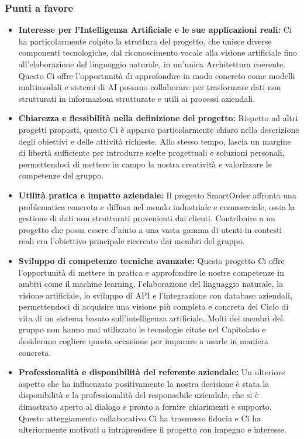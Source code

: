 \documentclass[a4paper,12pt]{article}
\begin{document}
\subsubsection{Punti a favore}

\begin{itemize}
    \item \textbf{Interesse per l’Intelligenza Artificiale e le sue applicazioni reali:} Ci ha particolarmente colpito la struttura del progetto, che unisce diverse componenti tecnologiche, dal riconoscimento vocale alla visione artificiale fino all’elaborazione del linguaggio naturale, in un’unica Architettura coerente. Questo Ci offre l’opportunità di approfondire in modo concreto come modelli multimodali e sistemi di AI possano collaborare per trasformare dati non strutturati in informazioni strutturate e utili ai processi aziendali.
    \item \textbf{Chiarezza e flessibilità nella definizione del progetto:} Rispetto ad altri progetti proposti, questo Ci è apparso particolarmente chiaro nella descrizione degli obiettivi e delle attività richieste. Allo stesso tempo, lascia un margine di libertà sufficiente per introdurre scelte progettuali e soluzioni personali, permettendoci di mettere in campo la nostra creatività e valorizzare le competenze del gruppo.
    \item \textbf{Utilità pratica e impatto aziendale:} Il progetto SmartOrder affronta una problematica concreta e diffusa nel mondo industriale e commerciale, ossia la gestione di dati non strutturati provenienti dai clienti. Contribuire a un progetto che possa essere d’aiuto a una vasta gamma di utenti in contesti reali era l’obiettivo principale ricercato dai membri del gruppo.
    \item \textbf{Sviluppo di competenze tecniche avanzate:} Questo progetto Ci offre l’opportunità di mettere in pratica e approfondire le nostre competenze in ambiti come il machine learning, l’elaborazione del linguaggio naturale, la visione artificiale, lo sviluppo di API e l’integrazione con database aziendali, permettendoci di acquisire una visione più completa e concreta del Ciclo di vita di un sistema basato sull’intelligenza artificiale. Molti dei membri del gruppo non hanno mai utilizzato le tecnologie citate nel Capitolato e desiderano cogliere questa occasione per imparare a usarle in maniera concreta.
    \item \textbf{Professionalità e disponibilità del referente aziendale:} Un ulteriore aspetto che ha influenzato positivamente la nostra decisione è stata la disponibilità e la professionalità del responsabile aziendale, che si è dimostrato aperto al dialogo e pronto a fornire chiarimenti e supporto. Questo atteggiamento collaborativo Ci ha trasmesso fiducia e Ci ha ulteriormente motivati a intraprendere il progetto con impegno e interesse.

\end{itemize}
\end{document}
